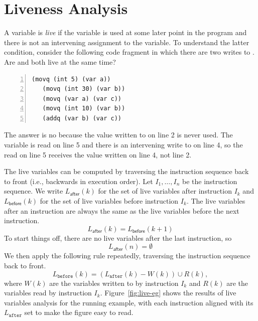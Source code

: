 \documentclass[11pt]{book}
\begin{document}
\section{Liveness Analysis}
\label{sec:liveness-analysis}

A variable is \emph{live} if the variable is used at some later point
in the program and there is not an intervening assignment to the
variable.
%
To understand the latter condition, consider the following code
fragment in which there are two writes to . Are  and
 both live at the same time?
\begin{lstlisting}[numbers=left,numberstyle=\tiny]
   (movq (int 5) (var a))
   (movq (int 30) (var b))
   (movq (var a) (var c))
   (movq (int 10) (var b))
   (addq (var b) (var c))
\end{lstlisting}
The answer is no because the value  written to  on
line 2 is never used. The variable  is read on line 5 and
there is an intervening write to  on line 4, so the read on
line 5 receives the value written on line 4, not line 2.

The live variables can be computed by traversing the instruction
sequence back to front (i.e., backwards in execution order).  Let
$I_1,\ldots, I_n$ be the instruction sequence. We write
$L_{\mathsf{after}}(k)$ for the set of live variables after
instruction $I_k$ and $L_{\mathsf{before}}(k)$ for the set of live
variables before instruction $I_k$. The live variables after an
instruction are always the same as the live variables before the next
instruction.
\begin{equation*}
  L_{\mathsf{after}}(k) = L_{\mathsf{before}}(k+1)
\end{equation*}
To start things off, there are no live variables after the last
instruction, so
\begin{equation*}
  L_{\mathsf{after}}(n) = \emptyset
\end{equation*}
We then apply the following rule repeatedly, traversing the
instruction sequence back to front.
\begin{equation*}
  L_{\mathtt{before}}(k) = (L_{\mathtt{after}}(k) - W(k)) \cup R(k),
\end{equation*}
where $W(k)$ are the variables written to by instruction $I_k$ and
$R(k)$ are the variables read by instruction $I_k$.
Figure~\ref{fig:live-eg} shows the results of live variables analysis
for the running example, with each instruction aligned with its
$L_{\mathtt{after}}$ set to make the figure easy to read.
\end{document}
